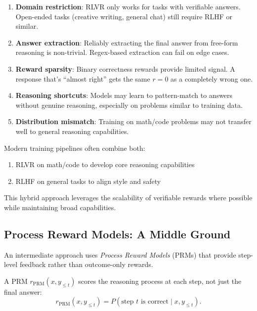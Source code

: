 \begin{enumerate}
    \item \textbf{Domain restriction}: RLVR only works for tasks with verifiable answers. Open-ended tasks (creative writing, general chat) still require RLHF or similar.

    \item \textbf{Answer extraction}: Reliably extracting the final answer from free-form reasoning is non-trivial. Regex-based extraction can fail on edge cases.

    \item \textbf{Reward sparsity}: Binary correctness rewards provide limited signal. A response that's ``almost right'' gets the same $r=0$ as a completely wrong one.

    \item \textbf{Reasoning shortcuts}: Models may learn to pattern-match to answers without genuine reasoning, especially on problems similar to training data.

    \item \textbf{Distribution mismatch}: Training on math/code problems may not transfer well to general reasoning capabilities.
\end{enumerate}

\begin{remark}
    Modern training pipelines often combine both:
    \begin{enumerate}
        \item RLVR on math/code to develop core reasoning capabilities
        \item RLHF on general tasks to align style and safety
    \end{enumerate}
    This hybrid approach leverages the scalability of verifiable rewards where possible while maintaining broad capabilities.
\end{remark}

\subsection{Process Reward Models: A Middle Ground}

An intermediate approach uses \emph{Process Reward Models} (PRMs) that provide step-level feedback rather than outcome-only rewards.

\begin{definition}
    A PRM $r_{\text{PRM}}(x, y_{\leq t})$ scores the reasoning process at each step, not just the final answer:
    \[
        r_{\text{PRM}}(x, y_{\leq t}) = P(\text{step } t \text{ is correct} \mid x, y_{\leq t}).
    \]
\end{definition}

